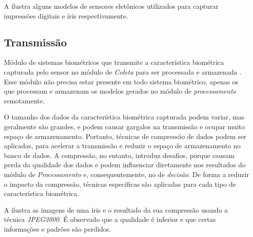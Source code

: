 \par A  ilustra alguns modelos de sensores eletônicos utilizados para capturar impressões digitais e íris respectivamente.


\subsection{Transmissão}\label{sec:sis_bio:transmissao}

\par Módulo de sistemas biométricos que transmite a característica biométrica capturada pelo sensor no módulo de \textit{Coleta} para ser processada e armazenada \cite{wayman2005biometric}. Esse módulo não precisa estar presente em todo sistema biométrico, apenas os que processam e armazenam os modelos gerados no módulo de \textit{processamento} remotamente.

\par O tamanho dos dados da característica biométrica capturada podem variar, mas geralmente são grandes, e podem causar gargalos na transmissão e ocupar muito espaço de armazenamento. Portanto, técnicas de compressão de dados podem ser aplicadas, para acelerar a transmissão e reduzir o espaço de armazenamento no banco de dados. A compressão, no entanto, introduz desafios, porque causam perda da qualidade dos dados e podem influenciar diretamente nos resultados do módulo de \textit{Processamento} e, consequentemente, no de \textit{decisão}. De forma a reduzir o impacto da compressão, técnicas específicas são aplicadas para cada tipo de característica biométrica.

\par A  ilustra as imagens de uma íris e o resultado da sua compressão usando a técnica \textit{JPEG2000}. É observado que a qualidade é inferior e que certas informações e padrões são perdidos.


